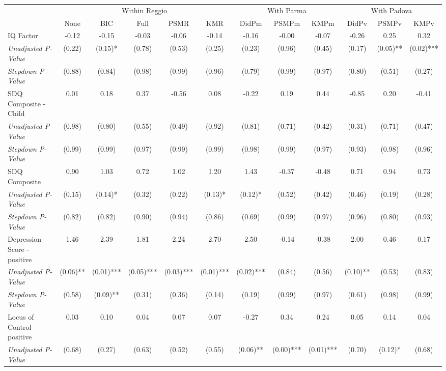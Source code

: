 \begin{tabular}{l c c c c c c c c c c c}
\toprule
& \multicolumn{5}{c}{Within Reggio} & \multicolumn{3}{c}{With Parma} & \multicolumn{3}{c}{With Padova} \\\cmidrule(lr){2-6} \cmidrule(lr){7-9} \cmidrule(lr){10-12}
 & None & BIC & Full & PSMR & KMR & DidPm & PSMPm & KMPm & DidPv & PSMPv & KMPv \\
\midrule
IQ Factor & -0.12 & -0.15 & -0.03 & -0.06 & -0.14 & -0.16 & -0.00 & -0.07 & -0.26 & 0.25 & 0.32 \\
\quad \textit{Unadjusted P-Value} & (0.22) & (0.15)* & (0.78) & (0.53) & (0.25) & (0.23) & (0.96) & (0.45) & (0.17) & (0.05)** & (0.02)*** \\
\quad \textit{Stepdown P-Value} & (0.88) & (0.84) & (0.98) & (0.99) & (0.96) & (0.79) & (0.99) & (0.97) & (0.80) & (0.51) & (0.27) \\
SDQ Composite - Child & 0.01 & 0.18 & 0.37 & -0.56 & 0.08 & -0.22 & 0.19 & 0.44 & -0.85 & 0.20 & -0.41 \\
\quad \textit{Unadjusted P-Value} & (0.98) & (0.80) & (0.55) & (0.49) & (0.92) & (0.81) & (0.71) & (0.42) & (0.31) & (0.71) & (0.47) \\
\quad \textit{Stepdown P-Value} & (0.99) & (0.99) & (0.97) & (0.99) & (0.99) & (0.98) & (0.99) & (0.97) & (0.93) & (0.98) & (0.96) \\
SDQ Composite & 0.90 & 1.03 & 0.72 & 1.02 & 1.20 & 1.43 & -0.37 & -0.48 & 0.71 & 0.94 & 0.73 \\
\quad \textit{Unadjusted P-Value} & (0.15) & (0.14)* & (0.32) & (0.22) & (0.13)* & (0.12)* & (0.52) & (0.42) & (0.46) & (0.19) & (0.28) \\
\quad \textit{Stepdown P-Value} & (0.82) & (0.82) & (0.90) & (0.94) & (0.86) & (0.69) & (0.99) & (0.97) & (0.96) & (0.80) & (0.93) \\
Depression Score - positive & 1.46 & 2.39 & 1.81 & 2.24 & 2.70 & 2.50 & -0.14 & -0.38 & 2.00 & 0.46 & 0.17 \\
\quad \textit{Unadjusted P-Value} & (0.06)** & (0.01)*** & (0.05)*** & (0.03)*** & (0.01)*** & (0.02)*** & (0.84) & (0.56) & (0.10)** & (0.53) & (0.83) \\
\quad \textit{Stepdown P-Value} & (0.58) & (0.09)** & (0.31) & (0.36) & (0.14) & (0.19) & (0.99) & (0.97) & (0.61) & (0.98) & (0.99) \\
Locus of Control - positive & 0.03 & 0.10 & 0.04 & 0.07 & 0.07 & -0.27 & 0.34 & 0.24 & 0.05 & 0.14 & 0.04 \\
\quad \textit{Unadjusted P-Value} & (0.68) & (0.27) & (0.63) & (0.52) & (0.55) & (0.06)** & (0.00)*** & (0.01)*** & (0.70) & (0.12)* & (0.68) \\

\end{tabular}

